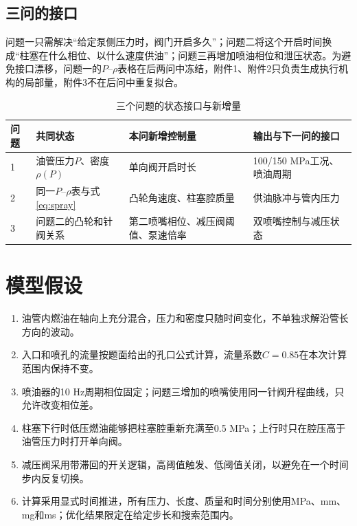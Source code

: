 \documentclass[UTF8,11pt,a4paper]{ctexart}
\begin{document}
\subsection{三问的接口}

问题一只需解决“给定泵侧压力时，阀门开启多久”；问题二将这个开启时间换成“柱塞在什么相位、以什么速度供油”；问题三再增加喷油相位和泄压状态。为避免接口漂移，问题一的$P$--$\rho$表格在后两问中冻结，附件1、附件2只负责生成执行机构的局部量，附件3不在后问中重复拟合。

\begin{table}[H]
\centering
\caption{三个问题的状态接口与新增量}
\label{tab:question-interface}
\small
\begin{tabularx}{\textwidth}{p{2cm}p{3.6cm}p{4.0cm}X}
\toprule
问题 & 共同状态 & 本问新增控制量 & 输出与下一问的接口\\
\midrule
1 & 油管压力$P$、密度$\rho(P)$ & 单向阀开启时长 & 100/150 MPa工况、喷油周期\\
2 & 同一$P$--$\rho$表与式\eqref{eq:spray} & 凸轮角速度、柱塞腔质量 & 供油脉冲与管内压力\\
3 & 问题二的凸轮和针阀关系 & 第二喷嘴相位、减压阀阈值、泵速倍率 & 双喷嘴控制与减压状态\\
\bottomrule
\end{tabularx}
\end{table}

\section{模型假设}
\begin{enumerate}[label=\arabic*)]
\item 油管内燃油在轴向上充分混合，压力和密度只随时间变化，不单独求解沿管长方向的波动。
\item 入口和喷孔的流量按题面给出的孔口公式计算，流量系数$C=0.85$在本次计算范围内保持不变。
\item 喷油器的10 Hz周期相位固定；问题三增加的喷嘴使用同一针阀升程曲线，只允许改变相位差。
\item 柱塞下行时低压燃油能够把柱塞腔重新充满至0.5 MPa；上行时只在腔压高于油管压力时打开单向阀。
\item 减压阀采用带滞回的开关逻辑，高阈值触发、低阈值关闭，以避免在一个时间步内反复切换。
\item 计算采用显式时间推进，所有压力、长度、质量和时间分别使用MPa、mm、mg和ms；优化结果限定在给定步长和搜索范围内。
\end{enumerate}
\end{document}
